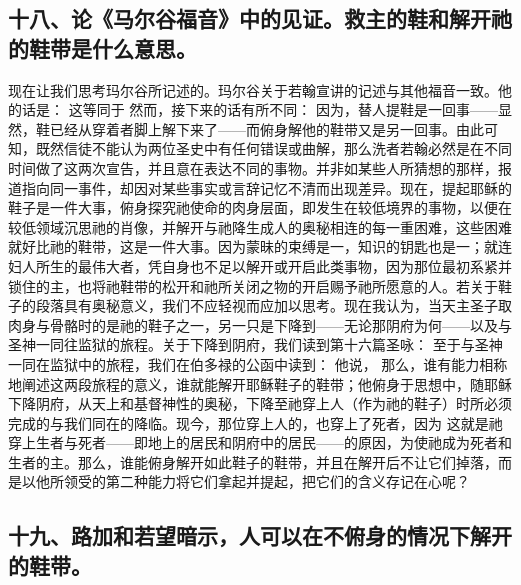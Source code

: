 
\subsection{十八、论《马尔谷福音》中的见证。救主的鞋和解开祂的鞋带是什么意思。}

现在让我们思考玛尔谷所记述的。玛尔谷关于若翰宣讲的记述与其他福音一致。他的话是： 这等同于  然而，接下来的话有所不同： 因为，替人提鞋是一回事——显然，鞋已经从穿着者脚上解下来了——而俯身解他的鞋带又是另一回事。由此可知，既然信徒不能认为两位圣史中有任何错误或曲解，那么洗者若翰必然是在不同时间做了这两次宣告，并且意在表达不同的事物。并非如某些人所猜想的那样，报道指向同一事件，却因对某些事实或言辞记忆不清而出现差异。现在，提起耶稣的鞋子是一件大事，俯身探究祂使命的肉身层面，即发生在较低境界的事物，以便在较低领域沉思祂的肖像，并解开与祂降生成人的奥秘相连的每一重困难，这些困难就好比祂的鞋带，这是一件大事。因为蒙昧的束缚是一，知识的钥匙也是一；就连妇人所生的最伟大者，凭自身也不足以解开或开启此类事物，因为那位最初系紧并锁住的主，也将祂鞋带的松开和祂所关闭之物的开启赐予祂所愿意的人。若关于鞋子的段落具有奥秘意义，我们不应轻视而应加以思考。现在我认为，当天主圣子取肉身与骨骼时的是祂的鞋子之一，另一只是下降到——无论那阴府为何——以及与圣神一同往监狱的旅程。关于下降到阴府，我们读到第十六篇圣咏： 至于与圣神一同在监狱中的旅程，我们在伯多禄的公函中读到：  他说， 那么，谁有能力相称地阐述这两段旅程的意义，谁就能解开耶稣鞋子的鞋带；他俯身于思想中，随耶稣下降阴府，从天上和基督神性的奥秘，下降至祂穿上人（作为祂的鞋子）时所必须完成的与我们同在的降临。现今，那位穿上人的，也穿上了死者，因为   这就是祂穿上生者与死者——即地上的居民和阴府中的居民——的原因，为使祂成为死者和生者的主。那么，谁能俯身解开如此鞋子的鞋带，并且在解开后不让它们掉落，而是以他所领受的第二种能力将它们拿起并提起，把它们的含义存记在心呢？\par


\subsection{十九、路加和若望暗示，人可以在不俯身的情况下解开的鞋带。}

